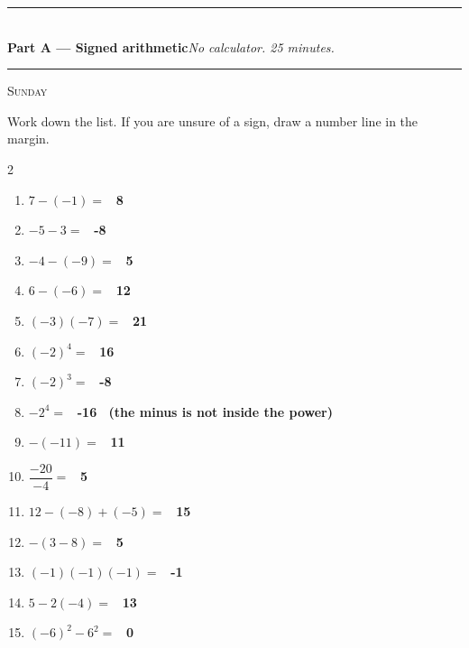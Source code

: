 \documentclass[11pt,a4paper]{article}
\newif\ifANSWERS
\newcommand{\PartHead}[2]{%
  \vspace{6pt}
  {\color{navy}\rule{\textwidth}{0.8pt}}\\[2pt]
  {\large\bfseries\color{navy}#1}\hfill{\small\itshape #2}\\[-4pt]
  {\color{navy}\rule{\textwidth}{0.4pt}}
  \vspace{4pt}
}
\newcommand{\sitting}[1]{{\footnotesize\textsc{\color{navy}#1}}\par\vspace{2pt}}
\newcommand{\ans}[1]{\ {\color{keyred}\bfseries #1}}
\newcommand{\ans}[1]{}
\begin{document}
\PartHead{Part A --- Signed arithmetic}{No calculator. 25 minutes.}
\sitting{Sunday}
Work down the list. If you are unsure of a sign, draw a number line in the margin.

\begin{multicols}{2}
\begin{enumerate}[leftmargin=20pt,itemsep=5pt]
\item $7-(-1)=$ \ifANSWERS\else\underline{\hspace{1.5cm}}\fi \ans{8}
\item $-5-3=$ \ifANSWERS\else\underline{\hspace{1.5cm}}\fi \ans{-8}
\item $-4-(-9)=$ \ifANSWERS\else\underline{\hspace{1.5cm}}\fi \ans{5}
\item $6-(-6)=$ \ifANSWERS\else\underline{\hspace{1.5cm}}\fi \ans{12}
\item $(-3)(-7)=$ \ifANSWERS\else\underline{\hspace{1.5cm}}\fi \ans{21}
\item $(-2)^4=$ \ifANSWERS\else\underline{\hspace{1.5cm}}\fi \ans{16}
\item $(-2)^3=$ \ifANSWERS\else\underline{\hspace{1.5cm}}\fi \ans{-8}
\item $-2^4=$ \ifANSWERS\else\underline{\hspace{1.5cm}}\fi \ans{-16 \ (the minus is not inside the power)}
\item $-(-11)=$ \ifANSWERS\else\underline{\hspace{1.5cm}}\fi \ans{11}
\item $\dfrac{-20}{-4}=$ \ifANSWERS\else\underline{\hspace{1.5cm}}\fi \ans{5}
\item $12-(-8)+(-5)=$ \ifANSWERS\else\underline{\hspace{1.5cm}}\fi \ans{15}
\item $-(3-8)=$ \ifANSWERS\else\underline{\hspace{1.5cm}}\fi \ans{5}
\item $(-1)(-1)(-1)=$ \ifANSWERS\else\underline{\hspace{1.5cm}}\fi \ans{-1}
\item $5-2(-4)=$ \ifANSWERS\else\underline{\hspace{1.5cm}}\fi \ans{13}
\item $(-6)^2-6^2=$ \ifANSWERS\else\underline{\hspace{1.5cm}}\fi \ans{0}
\end{enumerate}
\end{multicols}
\end{document}
